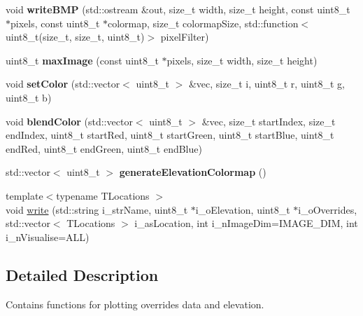 \begin{DoxyCompactItemize}
\item 
\mbox{\label{namespacevisualizer_a63e82fd57f54a0051c341db82d96b1e4}} 
void {\bfseries write\+B\+MP} (std\+::ostream \&out, size\+\_\+t width, size\+\_\+t height, const uint8\+\_\+t $\ast$pixels, const uint8\+\_\+t $\ast$colormap, size\+\_\+t colormap\+Size, std\+::function$<$ uint8\+\_\+t(size\+\_\+t, size\+\_\+t, uint8\+\_\+t)$>$ pixel\+Filter)
\item 
\mbox{\label{namespacevisualizer_a9cda773a43b5cf710ef2b1e6db058dab}} 
uint8\+\_\+t {\bfseries max\+Image} (const uint8\+\_\+t $\ast$pixels, size\+\_\+t width, size\+\_\+t height)
\item 
\mbox{\label{namespacevisualizer_ac115086a69d45560015dc16c27349a97}} 
void {\bfseries set\+Color} (std\+::vector$<$ uint8\+\_\+t $>$ \&vec, size\+\_\+t i, uint8\+\_\+t r, uint8\+\_\+t g, uint8\+\_\+t b)
\item 
\mbox{\label{namespacevisualizer_a627bff4c6bfe19982566020c2af63497}} 
void {\bfseries blend\+Color} (std\+::vector$<$ uint8\+\_\+t $>$ \&vec, size\+\_\+t start\+Index, size\+\_\+t end\+Index, uint8\+\_\+t start\+Red, uint8\+\_\+t start\+Green, uint8\+\_\+t start\+Blue, uint8\+\_\+t end\+Red, uint8\+\_\+t end\+Green, uint8\+\_\+t end\+Blue)
\item 
\mbox{\label{namespacevisualizer_ae01858882fd46cf76a74b329b97598b9}} 
std\+::vector$<$ uint8\+\_\+t $>$ {\bfseries generate\+Elevation\+Colormap} ()
\item 
{\footnotesize template$<$typename T\+Locations $>$ }\\void \mbox{\hyperlink{namespacevisualizer_a67da0136480955913d914be67573251d}{write}} (std\+::string i\+\_\+str\+Name, uint8\+\_\+t $\ast$i\+\_\+o\+Elevation, uint8\+\_\+t $\ast$i\+\_\+o\+Overrides, std\+::vector$<$ T\+Locations $>$ i\+\_\+as\+Location, int i\+\_\+n\+Image\+Dim=I\+M\+A\+G\+E\+\_\+\+D\+IM, int i\+\_\+n\+Visualise=A\+LL)
\end{DoxyCompactItemize}


\subsection{Detailed Description}
Contains functions for plotting overrides data and elevation. 

